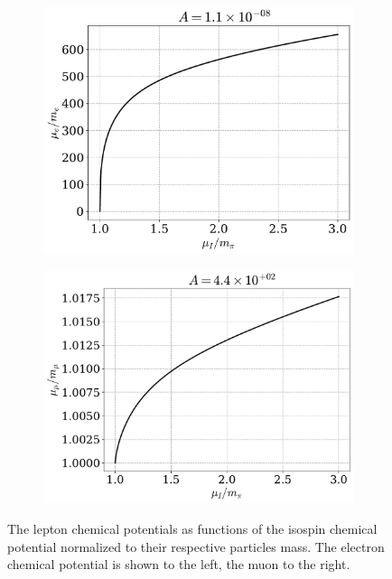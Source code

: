\begin{figure}[!htb]
    \centering
    \begin{subfigure}{0.49 \textwidth}
        \includegraphics[width=\textwidth]{../scripts/figurer/charge_neutrality/chemical_potential_e.pdf}
    \end{subfigure}
    \begin{subfigure}{0.49\textwidth}
        \includegraphics[width=\textwidth]{../scripts/figurer/charge_neutrality/chemical_potential_mu.pdf}
    \end{subfigure} 
    \caption{
        The lepton chemical potentials as functions of the isospin chemical potential normalized to their respective particles mass.
        The electron chemical potential is shown to the left, the muon to the right.
    } 
    \label{fig: chemical potentials}
\end{figure}


